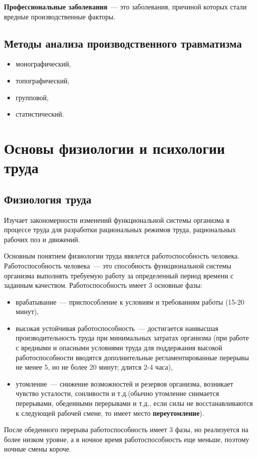 \textbf{Профессиональные заболевания}~--- это заболевания, причиной которых стали вредные производственные факторы.

\subsection{Методы анализа производственного травматизма}
\begin{itemize}
	\item монографический,
	\item топографический,
	\item групповой,
	\item статистический.
\end{itemize}

\section{Основы физиологии и психологии труда}
\subsection{Физиология труда}
Изучает закономерности изменений функциональной системы организма в процессе труда для разработки рациональных режимов труда, рациональных рабочих поз и движений.

Основным понятием физиологии труда явялется работоспособность человека. Работоспособность человека~--- это способность функциональной системы организма выполнять требуемую работу за определенный период времени с заданным качеством. Работоспособность имеет 3 основные фазы:
\begin{itemize}
	\item врабатывание~--- приспособление к условиям и требованиям работы (15-20 минут),
	\item высокая устойчивая работоспособность~--- достигается наивысшая производительность труда при минимальных затратах организма (при работе с вредными и опасными условиями труда для поддержания высокой работоспособности вводятся дополнительные регламентированные перерывы не менее 5, но не более 20 минут; длится 2-4 часа),
	\item утомление~--- снижение возможностей и резервов организма, возникает чувство усталости, сонливости и т.д.(обычно утомление снимается перерывами, обеденными перерывами и т.д., если силы не восстанавливаются к следующей рабочей смене, то имеет место \textbf{переутомление}).
\end{itemize}
После обеденного перерыва работоспособность имеет 3 фазы, но реализуется на более низком уровне, а в ночное время работоспособность еще меньше, поэтому ночные смены короче.
